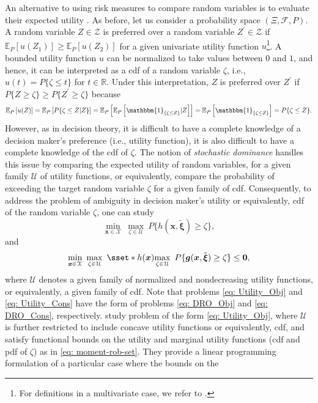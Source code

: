 \documentclass[final,onefignum,onetabnum]{class}
\newcommand{\ee}[2]{\mathbb{E}_{#1} \left[ #2 \right]}
\newcommand{\bs}[1]{\boldsymbol{#1}} %
\newcommand{\Bs}[1]{\mathbb{#1}} %
\newcommand{\Cs}[1]{\mathcal{#1}} %
\newcommand{\txi}{\tilde{\bs{\xi}}}
\newcommand{\one}[1]{\mathbbm{1}_{\{#1\}}}
\newcommand{\Pspace}[1]{\left( \Xi, \Cs{F}, #1 \right)}
\begin{document}
An alternative to using risk measures to compare random variables is to evaluate their expected utility \citet{gilboa1989}.  
As before, let us consider a probability space $\Pspace{P}$. A random variable $Z \in \Cs{Z}$ is preferred over a  random variable $Z^{\prime} \in \Cs{Z}$ if $\ee{P}{u(Z_{1})} \ge \ee{P}{u(Z_{2})}$ for a given  univariate utility function $u$\footnote{For definitions in a multivariate case, we refer to \citet{hu2012SAA,hu2014weighted}.}. A bounded utility function $u$ can be normalized to take values between $0$ and $1$, and hence, it can be interpreted as a cdf of a random variable $\zeta$, i.e., $u(t)=P\{\zeta \le t\}$ for $t \in \Bs{R}$. Under this interpretation, $Z$ is preferred over  $Z^{\prime}$ if $P\{Z \ge \zeta\} \ge P\{Z^{\prime} \ge \zeta\} $ because 
$$\ee{P}{u(Z)}=\ee{P}{P\{\zeta \le Z| Z\}}=\ee{P}{\ee{P}{\one{\zeta \le Z}|Z}}=\ee{P}{\one{\zeta \le Z}}=P\{\zeta \le Z\}.$$
However, as in decision theory, it is difficult to have a complete knowledge of a decision maker's preference (i.e., utility function), it is also difficult to have a complete knowledge of the cdf of $\zeta$. The notion of {\it stochastic dominance} handles this issue by comparing the expected utility of random variables, for a given family $\Cs{U}$ of utility functions, or equivalently, compare the probability of exceeding the target random variable $\zeta$ for a given family of cdf. Consequently,  to address the problem of ambiguity in decision maker's utility or equivalently, cdf of  the random variable $\zeta$, one can study   
\begin{equation}
\label{eq: Utility_Obj}
\min_{\bs{x} \in \Cs{X} } \ \max_{\zeta \in \Cs{U}} \ 	P\{h(\bs{x},\txi) \ge \zeta\},
\end{equation}
and
\begin{equation}
\label{eq: Utility_Cons}
\min_{\bs{x} \in \Cs{X} } \ \max_{\zeta \in \Cs{U}} \ 	\sset*{h(\bs{x})}{\max_{\zeta \in \Cs{U} } \ P\{\bs{g}(\bs{x},\txi) \ge \zeta\} \le \bs{0}},
\end{equation}
where $\Cs{U}$ denotes a given family of normalized and nondecreasing utility functions, or equivalently, a given family of  cdf. 
Note that  problems \eqref{eq: Utility_Obj} and \eqref{eq: Utility_Cons} have the form of problems \eqref{eq: DRO_Obj} and \eqref{eq: DRO_Cons}, respectively.
\citet{hu2015utility} study problem of the form  \eqref{eq: Utility_Obj}, where $\Cs{U}$ is further restricted to include concave utility functions or equivalently, cdf, and satisfy functional bounds on the utility and marginal utility functions (cdf  and pdf of $\zeta$)  as in \eqref{eq: moment-rob-set}. They provide a linear programming formulation of a particular case where the bounds on the
\end{document}
